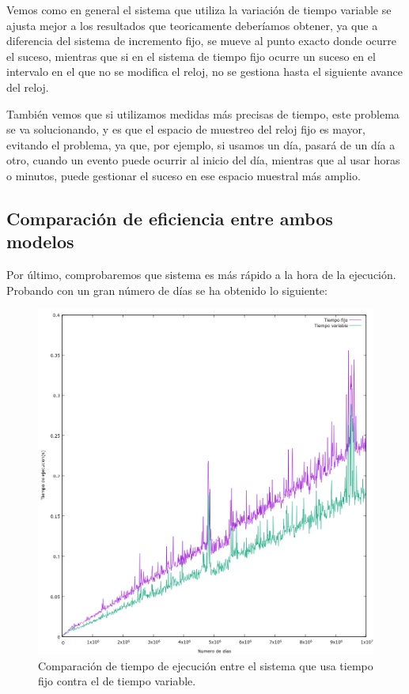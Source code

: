 \documentclass[12pt, spanish]{article}
\begin{document}
Vemos como en general el sistema que utiliza la variación de tiempo variable se ajusta mejor a los resultados que teoricamente deberíamos obtener, ya que a diferencia del sistema de incremento fijo, se mueve al punto exacto donde ocurre el suceso, mientras que si en el sistema de tiempo fijo ocurre un suceso en el intervalo en el que no se modifica el reloj, no se gestiona hasta el siguiente avance del reloj.

También vemos que si utilizamos medidas más precisas de tiempo, este problema se va solucionando, y es que el espacio de muestreo del reloj fijo es mayor, evitando el problema, ya que, por ejemplo, si usamos un día, pasará de un día a otro, cuando un evento puede ocurrir al inicio del día, mientras que al usar horas o minutos, puede gestionar el suceso en ese espacio muestral más amplio.


\subsection{Comparación de eficiencia entre ambos modelos}

Por último, comprobaremos que sistema es más rápido a la hora de la ejecución. Probando con un gran número de días se ha obtenido lo siguiente:

\begin{figure}[H]
  \centering
      \includegraphics[width=\textwidth]{t1_eficiencia.png}
 		\caption{Comparación de tiempo de ejecución entre el sistema que usa tiempo fijo contra el de tiempo variable.}
\end{figure}
\end{document}
